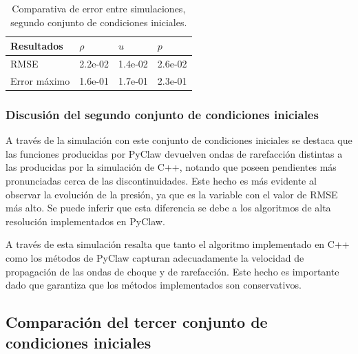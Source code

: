 \begin{table}[H]
	\large
	\centering
	\begin{tabular}{|l|l|l|l|} \hline
		Resultados & $\rho$ & $u$ & $p$ \\ \hline
		RMSE & 2.2e-02 & 1.4e-02 & 2.6e-02 \\ \hline
		Error máximo & 1.6e-01 & 1.7e-01 & 2.3e-01 \\ \hline
	\end{tabular}
	\caption{Comparativa de error entre simulaciones, segundo conjunto de condiciones iniciales.}
	\label{tab:tabla-set-2}
\end{table}
\vspace{3\baselineskip}
\subsubsection{Discusión del segundo conjunto de condiciones iniciales}
A través de la simulación con este conjunto de condiciones iniciales se destaca que las funciones producidas por PyClaw devuelven ondas de rarefacción distintas a las producidas por la simulación de C++, notando que poseen pendientes más pronunciadas cerca de las discontinuidades. Este hecho es más evidente al observar la evolución de la presión, ya que es la variable con el valor de RMSE más alto. Se puede inferir que esta diferencia se debe a los algoritmos de alta resolución implementados en PyClaw.

A través de esta simulación resalta que tanto el algoritmo implementado en C++ como los métodos de PyClaw capturan adecuadamente la velocidad de propagación de las ondas de choque y de rarefacción. Este hecho es importante dado que garantiza que los métodos implementados son conservativos.
\clearpage
%
\subsection{Comparación del tercer conjunto de condiciones iniciales}
